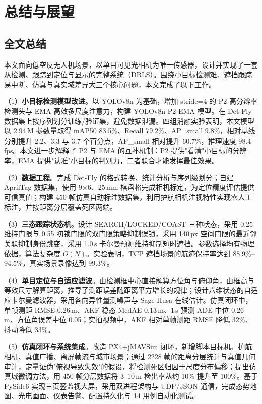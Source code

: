 \chapter{总结与展望}

\section{全文总结}

本文面向低空反无人机场景，以单目可见光相机为唯一传感器，设计并实现了一套从检测、跟踪到定位与显示的完整系统（DRLS）。围绕小目标检测难、遮挡跟踪易中断、仿真与真实域差异大三个核心问题，本文完成了以下工作。

（1）\textbf{小目标检测模型改进}。以 YOLOv8n 为基础，增加 stride=4 的 P2 高分辨率检测头与 EMA 高效多尺度注意力，构建 YOLOv8n-P2-EMA 模型。在 Det-Fly 数据集上按序列划分训练/验证集，避免数据泄漏。四组消融实验表明，本文模型以 2.94\,M 参数量取得 mAP50 83.5\%、Recall 79.2\%、AP\_small 9.8\%，相对基线分别提升 2.2、3.3 与 3.7 个百分点，AP\_small 相对提升 60.7\%，推理速度 98.4\,fps。本文进一步解释了 P2 与 EMA 的互补机制：P2 提供"看清"小目标的分辨率，EMA 提供"认准"小目标的判别力，二者联合才能发挥最佳效果。

（2）\textbf{数据工程}。完成 Det-Fly 的格式转换、统计分析与序列级划分；自建 AprilTag 数据集，使用 9$\times$6、25\,mm 棋盘格完成相机标定，为定位精度评估提供可信真值；构建 450 帧仿真自动标注数据集，利用护航相机注视特性实现零人工标注，并按距离分层覆盖死区两端。

（3）\textbf{三态跟踪状态机}。设计 SEARCH/LOCKED/COAST 三种状态，采用 0.25 维持门限与 0.55 初锁门限的双门限策略抑制误锁，采用 140\,px 空间门限的最近邻关联抑制身份跳变，采用 1.0\,s 卡尔曼预测维持抑制短时遮挡。参数选择均有物理依据，算法复杂度 $O(N)$。实验表明，TCP 遮挡场景的航迹保持率达到 88.9\%--94.5\%，真实场景录像达到 99.3\%。

（4）\textbf{单目定位与自适应滤波}。由检测框中心直接解算方位角与俯仰角，由框高与等效尺寸解算距离，推导了测距误差随距离平方增长的规律；设计六维状态的自适应卡尔曼滤波器，采用各向异性量测噪声与 Sage-Husa 在线估计。仿真闭环中，单帧测距 RMSE 0.26\,m、AKF 稳态 MedAE 0.13\,m、1\,s 预测 ADE 中位 0.26\,m、方位角误差中位 0.05\textdegree；实拍视频中，AKF 相对单帧测距 RMSE 降低 32\%、抖动降低 33\%。

（5）\textbf{仿真闭环与系统集成}。改造 PX4+jMAVSim 闭环，新增脚本目标机、护航相机、真值广播、离屏帧流与城市场景；通过 2228 帧的距离分层统计与真值几何审计，定量证伪"俯视导致失效"的假设，将检测死区归因于尺度分布偏移；提出仿真域微调方法，用 450 帧分层数据将 3--10\,m 检出率从约 10\% 提升至 100\%。基于 PySide6 实现三页签监视大屏，采用双进程架构与 UDP/JSON 通信，完成态势地图、光电画面、仪表告警、配置持久化与 14 用例自动化测试。


